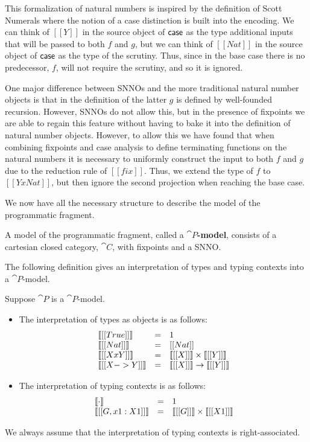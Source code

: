 \noindent This formalization of natural numbers is inspired by the
definition of Scott Numerals \cite{??} where the notion of a case
distinction is built into the encoding. We can think of $[[Y]]$ in the
source object of $\mathsf{case}$ as the type additional inputs that will be
passed to both $f$ and $g$, but we can think of $[[Nat]]$ in the
source object of $\mathsf{case}$ as the type of the scrutiny.  Thus, since in
the base case there is no predecessor, $f$, will not require the
scrutiny, and so it is ignored.  

One major difference between SNNOs and the more traditional natural
number objects is that in the definition of the latter $g$ is defined
by well-founded recursion.  However, SNNOs do not allow this, but in
the presence of fixpoints we are able to regain this feature without
having to bake it into the definition of natural number objects.
However, to allow this we have found that when combining fixpoints and
case analysis to define terminating functions on the natural numbers
it is necessary to uniformly construct the input to both $f$ and $g$
due to the reduction rule of $[[fix]]$.  Thus, we extend the type of
$f$ to $[[Y x Nat]]$, but then ignore the second projection when
reaching the base case.

We now have all the necessary structure to describe the model of the
programmatic fragment.
\begin{definition}
  \label{def:P-model}
  A model of the programmatic fragment, called a
  \textbf{$\cat{P}$-model}, consists of a cartesian closed category,
  $\cat{C}$, with fixpoints and a SNNO.
\end{definition}
\noindent
The following definition gives an interpretation of types and typing
contexts into a $\cat{P}$-model.
\begin{definition}
  \label{def:term-interp}
  Suppose $\cat{P}$ is a $\cat{P}$-model.
  \begin{itemize}
  \item The interpretation of types as objects is as follows:
    \[
    \begin{array}{lll}
      \llbracket [[True]] \rrbracket & = & 1\\
      \llbracket [[Nat]] \rrbracket & = & [[Nat]]\\
      \llbracket [[X x Y]] \rrbracket & = & \llbracket [[X]] \rrbracket \times \llbracket [[Y]] \rrbracket\\
      \llbracket [[X -> Y]] \rrbracket & = & \llbracket [[X]] \rrbracket \rightarrow \llbracket [[Y]] \rrbracket\\      
    \end{array}
    \]

  \item The interpretation of typing contexts is as follows:
    \[
    \begin{array}{lll}
      \llbracket \cdot \rrbracket & = & 1\\
      \llbracket [[G,x1 : X1]] \rrbracket & = &
      \llbracket [[G]] \rrbracket \times \llbracket [[X1]] \rrbracket\\
    \end{array}
    \]
  \end{itemize}
  We always assume that the interpretation of typing contexts is
  right-associated.  
\end{definition}

